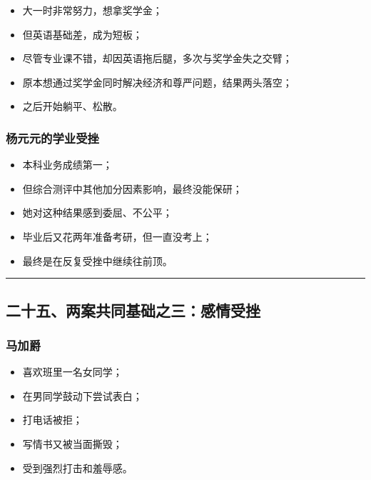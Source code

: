 \documentclass[
  chinese,
  9pt,
  a4paper,
]{ctexart}
\providecommand{\tightlist}{%
  \setlength{\itemsep}{0pt}\setlength{\parskip}{0pt}}
\begin{document}
\begin{itemize}
\tightlist
\item
  大一时非常努力，想拿奖学金；
\item
  但英语基础差，成为短板；
\item
  尽管专业课不错，却因英语拖后腿，多次与奖学金失之交臂；
\item
  原本想通过奖学金同时解决经济和尊严问题，结果两头落空；
\item
  之后开始躺平、松散。
\end{itemize}

\subsubsection{杨元元的学业受挫}\label{ux6768ux5143ux5143ux7684ux5b66ux4e1aux53d7ux632b}

\begin{itemize}
\tightlist
\item
  本科业务成绩第一；
\item
  但综合测评中其他加分因素影响，最终没能保研；
\item
  她对这种结果感到委屈、不公平；
\item
  毕业后又花两年准备考研，但一直没考上；
\item
  最终是在反复受挫中继续往前顶。
\end{itemize}

\begin{center}\rule{0.5\linewidth}{0.5pt}\end{center}

\subsection{二十五、两案共同基础之三：感情受挫}\label{ux4e8cux5341ux4e94ux4e24ux6848ux5171ux540cux57faux7840ux4e4bux4e09ux611fux60c5ux53d7ux632b}

\subsubsection{马加爵}\label{ux9a6cux52a0ux7235}

\begin{itemize}
\tightlist
\item
  喜欢班里一名女同学；
\item
  在男同学鼓动下尝试表白；
\item
  打电话被拒；
\item
  写情书又被当面撕毁；
\item
  受到强烈打击和羞辱感。
\end{itemize}
\end{document}
